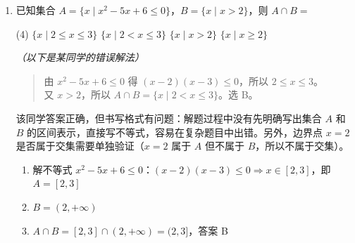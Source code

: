 \begin{enumerate}[itemsep=1.2em, left=0pt, label={}]
\begin{solution}
    \par{}%
    求极值必须包含三步：求导 → 找驻点 → 验证符号变化。不能只算函数值就下结论。

    \par{}%
    变式：已知 $f(x)=x^3-3ax+2$ 在 $x=1$ 处取得极值，求 $a$ 的值及另一个极值点。
\end{solution}

\vspace{0.5cm}

\item \typeChoice\quad{}

\medskip
\noindent 已知集合 $A=\{x \mid x^2-5x+6 \leqslant 0\}$，$B=\{x \mid x > 2\}$，则 $A \cap B=$

\begin{tasks}(4)
    \task $\{x \mid 2 \leqslant x \leqslant 3\}$
    \task $\{x \mid 2 < x \leqslant 3\}$
    \task $\{x \mid x > 2\}$
    \task $\{x \mid x \geqslant 2\}$
\end{tasks}

\medskip
\noindent\textit{\color{gray!70!black}（以下是某同学的错误解法）}
\begin{quote}
    \color{gray!50!black}
    由 $x^2-5x+6 \leqslant 0$ 得 $(x-2)(x-3) \leqslant 0$，所以 $2 \leqslant x \leqslant 3$。\\
    又 $x > 2$，所以 $A \cap B = \{x \mid 2 < x \leqslant 3\}$。选 B。
\end{quote}

\begin{solution}
    \par{}%
    该同学答案正确，但书写格式有问题：解题过程中没有先明确写出集合 $A$ 和 $B$ 的区间表示，直接写不等式，容易在复杂题目中出错。另外，边界点 $x=2$ 是否属于交集需要单独验证（$x=2$ 属于 $A$ 但不属于 $B$，所以不属于交集）。

    \par{}%
    \begin{enumerate}[label=(\arabic*), leftmargin=2em]
        \item 解不等式 $x^2-5x+6 \leqslant 0$：$(x-2)(x-3) \leqslant 0 \Rightarrow x \in [2,3]$，即 $A=[2,3]$
        \item $B=(2,+\infty)$
        \item $A \cap B = [2,3] \cap (2,+\infty) = (2,3]$，答案 B
    \end{enumerate}


\end{solution}
\end{enumerate}
